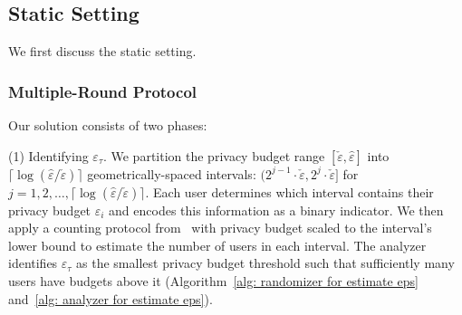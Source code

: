 

    







\subsection{Static Setting}
We first discuss the static setting. 

\subsubsection{Multiple-Round Protocol}

Our solution consists of two phases:

(1) Identifying $\varepsilon_\tau$. 
We partition the privacy budget range $[\check{\varepsilon}, \hat{\varepsilon}]$ into $\lceil \log(\hat{\varepsilon}/\check{\varepsilon}) \rceil$ geometrically-spaced intervals: $(2^{j-1} \cdot \check{\varepsilon}, 2^j \cdot \check{\varepsilon}]$ for $j = 1, 2, \ldots, \lceil \log(\hat{\varepsilon}/\check{\varepsilon}) \rceil$. 
Each user determines which interval contains their privacy budget $\varepsilon_i$ and encodes this information as a binary indicator. 
We then apply a counting protocol from~\cite{ghazi2021differentially} with privacy budget scaled to the interval's lower bound to estimate the number of users in each interval. 
The analyzer identifies $\varepsilon_\tau$ as the smallest privacy budget threshold such that sufficiently many users have budgets above it (Algorithm~\ref{alg: randomizer for estimate eps} and~\ref{alg: analyzer for estimate eps}).

